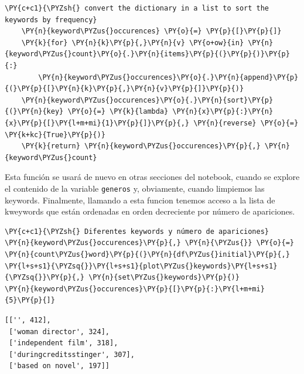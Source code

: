 \begin{tcolorbox}[breakable, size=fbox, boxrule=1pt, pad at break*=1mm,colback=cellbackground, colframe=cellborder]
\begin{Verbatim}[commandchars=\\\{\}]
    \PY{c+c1}{\PYZsh{} convert the dictionary in a list to sort the keywords by frequency}
    \PY{n}{keyword\PYZus{}occurences} \PY{o}{=} \PY{p}{[}\PY{p}{]}
    \PY{k}{for} \PY{n}{k}\PY{p}{,}\PY{n}{v} \PY{o+ow}{in} \PY{n}{keyword\PYZus{}count}\PY{o}{.}\PY{n}{items}\PY{p}{(}\PY{p}{)}\PY{p}{:}
        \PY{n}{keyword\PYZus{}occurences}\PY{o}{.}\PY{n}{append}\PY{p}{(}\PY{p}{[}\PY{n}{k}\PY{p}{,}\PY{n}{v}\PY{p}{]}\PY{p}{)}
    \PY{n}{keyword\PYZus{}occurences}\PY{o}{.}\PY{n}{sort}\PY{p}{(}\PY{n}{key} \PY{o}{=} \PY{k}{lambda} \PY{n}{x}\PY{p}{:}\PY{n}{x}\PY{p}{[}\PY{l+m+mi}{1}\PY{p}{]}\PY{p}{,} \PY{n}{reverse} \PY{o}{=} \PY{k+kc}{True}\PY{p}{)}
    \PY{k}{return} \PY{n}{keyword\PYZus{}occurences}\PY{p}{,} \PY{n}{keyword\PYZus{}count}
\end{Verbatim}
\end{tcolorbox}

    Esta función se usará de nuevo en otras secciones del notebook, cuando
se explore el contenido de la variable \texttt{generos} y, obviamente,
cuando limpiemos las keywords. Finalmente, llamando a esta funcion
tenemos acceso a la lista de kweywords que están ordenadas en orden
decreciente por número de apariciones.

    \begin{tcolorbox}[breakable, size=fbox, boxrule=1pt, pad at break*=1mm,colback=cellbackground, colframe=cellborder]
\begin{Verbatim}[commandchars=\\\{\}]
\PY{c+c1}{\PYZsh{} Diferentes keywords y número de apariciones}
\PY{n}{keyword\PYZus{}occurences}\PY{p}{,} \PY{n}{\PYZus{}} \PY{o}{=} \PY{n}{count\PYZus{}word}\PY{p}{(}\PY{n}{df\PYZus{}initial}\PY{p}{,} \PY{l+s+s1}{\PYZsq{}}\PY{l+s+s1}{plot\PYZus{}keywords}\PY{l+s+s1}{\PYZsq{}}\PY{p}{,} \PY{n}{set\PYZus{}keywords}\PY{p}{)}
\PY{n}{keyword\PYZus{}occurences}\PY{p}{[}\PY{p}{:}\PY{l+m+mi}{5}\PY{p}{]}
\end{Verbatim}
\end{tcolorbox}

            \begin{tcolorbox}[breakable, boxrule=.5pt, size=fbox, pad at break*=1mm, opacityfill=0]
\begin{Verbatim}[commandchars=\\\{\}]
[['', 412],
 ['woman director', 324],
 ['independent film', 318],
 ['duringcreditsstinger', 307],
 ['based on novel', 197]]
\end{Verbatim}
\end{tcolorbox}
        
